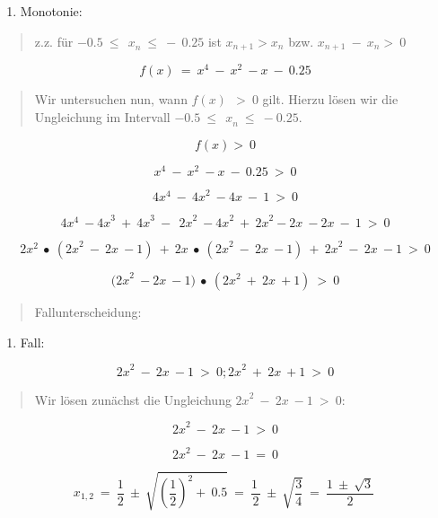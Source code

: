 \documentclass{book}
\begin{document}
\begin{longtable}[]
\begin{minipage}[b]{\linewidth}
\begin{enumerate}
\def\labelenumi{\arabic{enumi})}
\item
  Monotonie:
\end{enumerate}

\begin{quote}
z.z. für \(- 0.5\ {\leq \ \ x}_{n}\  \leq \  - \ 0.25\) ist
\(x_{n + 1} > x_{n}\) bzw. \(x_{n + 1}\  - {\ x}_{n} > \ 0\)
\end{quote}

\[f(x)\  = \ x^{4}\  - \ x^{2}\  - x\  - \ 0.25\]

\begin{quote}
Wir untersuchen nun, wann \(f(x)\ \  > \ 0\) gilt. Hierzu lösen wir die
Ungleichung im Intervall \(- 0.5\ {\leq \ \ x}_{n}\  \leq \  - 0.25\).
\end{quote}

\[f(x) > \ 0\]

\[x^{4}\  - \ x^{2}\  - x\  - \ 0.25\  > \ 0\]

\[4x^{4}\  - \ {4x}^{2}\  - 4x\  - \ 1\  > \ 0\]

\[4x^{4}\  - {4x}^{3}\  + \ {4x}^{3}\  - \ \ {2x}^{2}\  - {4x}^{2}\  + \ {2x}^{2} - 2x\  - 2x\  - \ 1\  > \ 0\]

\[2x^{2}\  \bullet \ ({2x}^{2}\  - \ 2x\  - 1)\  + \ 2x\  \bullet \ ({2x}^{2}\  - \ 2x\  - 1)\  + \ {2x}^{2}\  - \ 2x\  - 1\  > \ 0\]

\[{(2x}^{2}\  - 2x\  - 1)\  \bullet \ ({2x}^{2}\  + \ 2x\  + 1)\  > \ 0\]

\begin{quote}
Fallunterscheidung:
\end{quote}

\begin{enumerate}
\def\labelenumi{\arabic{enumi}.}
\item
  Fall:
\end{enumerate}

\[{2x}^{2}\  - \ 2x\  - 1\  > \ 0;{2x}^{2}\  + \ 2x\  + 1\  > \ 0\]

\begin{quote}
Wir lösen zunächst die Ungleichung \({2x}^{2}\  - \ 2x\  - 1\  > \ 0\):
\end{quote}

\[{2x}^{2}\  - \ 2x\  - 1\  > \ 0\]

\[{2x}^{2}\  - \ 2x\  - 1\  = \ 0\]

\[x_{1,2}\  = \ \frac{1}{2}\  \pm \ \sqrt{\left( \frac{1}{2} \right)^{2} + \ 0.5}\  = \ \frac{1\ }{2}\  \pm \ \sqrt{\frac{3}{4}}\  = \ \frac{1\  \pm \ \sqrt{3}}{2}\ \]


\end{minipage}
\end{longtable}
\end{document}

